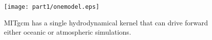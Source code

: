 \begin{figure}
\begin{center}
 \texttt{[image: part1/onemodel.eps]}
\end{center}
\caption{MITgcm has a single hydrodynamical kernel that can drive forward
either oceanic or atmospheric simulations.}
\label{fig:onemodel}
\end{figure}
